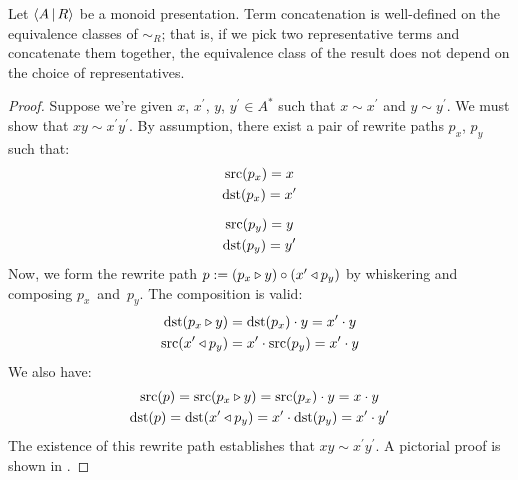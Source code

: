 \documentclass[../generics]{subfiles}
\begin{document}
\begin{theorem}
Let $\langle A\,|\,R\rangle$ be a monoid presentation. Term concatenation is well-defined on the equivalence classes of $\sim_R$; that is, if we pick two representative terms and concatenate them together, the equivalence class of the result does not depend on the choice of representatives.
\end{theorem}
\begin{proof}
Suppose we're given $x$, $x^\prime$, $y$, $y^\prime\in A^*$ such that $x\sim x^\prime$ and $y\sim y^\prime$. We must show that $xy\sim x^\prime y^\prime$. By assumption, there exist a pair of rewrite paths $p_x$, $p_y$ such that:
\begin{gather*}
\operatorname{src}(p_x)=x\\
\operatorname{dst}(p_x)=x^\prime\\[\medskipamount]
\operatorname{src}(p_y)=y\\
\operatorname{dst}(p_y)=y^\prime
\end{gather*}
Now, we form the rewrite path $p := (p_x\triangleright y) \circ (x^\prime\triangleleft p_y)$ by whiskering and composing $p_x$~and~$p_y$. The composition is valid:
\begin{gather*}
\operatorname{dst}(p_x\triangleright y)=\operatorname{dst}(p_x)\cdot y=x^\prime\cdot y\\
\operatorname{src}(x^\prime\triangleleft p_y)=x^\prime\cdot\operatorname{src}(p_y)=x^\prime\cdot y
\end{gather*}
We also have:
\begin{gather*}
\operatorname{src}(p) = \operatorname{src}(p_x\triangleright y) = \operatorname{src}(p_x)\cdot y = x\cdot y\\
\operatorname{dst}(p) = \operatorname{dst}(x^\prime\triangleleft p_y) = x^\prime \cdot \operatorname{dst}(p_y) = x^\prime\cdot y^\prime
\end{gather*}
The existence of this rewrite path establishes that $xy\sim x^\prime y^\prime$. A pictorial proof is shown in .
\end{proof}
\end{document}
